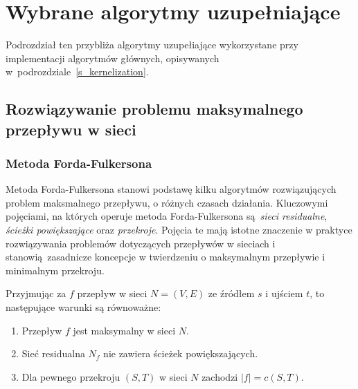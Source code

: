 \section{Wybrane algorytmy uzupełniające}\label{s_supplementary_algorithms}
\par{
  Podrozdział ten przybliża algorytmy uzupełiające wykorzystane przy 
  implementacji algorytmów głównych, opisywanych 
  w~podrozdziale~\ref{s_kernelization}.
}

\subsection{Rozwiązywanie problemu maksymalnego przepływu w sieci}\label{ss_max_flow}
\subsubsection{Metoda Forda-Fulkersona}
\par{
  Metoda Forda-Fulkersona stanowi podstawę kilku algorytmów rozwiązujących problem maksmalnego przepływu, o różnych czasach działania.
  Kluczowymi pojęciami, na których operuje metoda Forda-Fulkersona są \emph{sieci residualne}, \emph{ścieżki powiększające} oraz \emph{przekroje}.
  Pojęcia te mają istotne znaczenie w praktyce rozwiązywania problemów dotyczących przepływów w sieciach i stanowią zasadnicze koncepcje w twierdzeniu o maksymalnym przepływie i minimalnym przekroju.
  \begin{theorem}
    Przyjmując za $f$ przepływ w sieci $N=(V,E)$ ze źródłem $s$ i ujściem $t$, to następujące warunki są równoważne:
    \begin{enumerate}
      \item Przepływ $f$ jest maksymalny w sieci $N$.
      \item Sieć residualna $N_f$ nie zawiera ścieżek powiększających.
      \item Dla pewnego przekroju $(S, T)$ w sieci $N$ zachodzi $|f|=c(S,T)$.
    \end{enumerate}
  \end{theorem}
}

